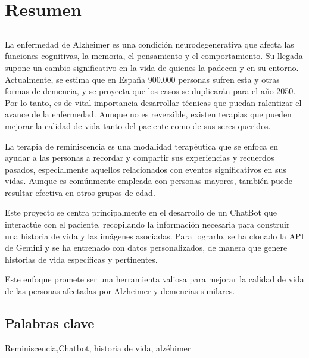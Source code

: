 \chapter*{Resumen}
\section*{\tituloPortadaVal}
La enfermedad de Alzheimer es una condición neurodegenerativa que afecta las funciones cognitivas, la memoria, el pensamiento y el comportamiento. Su llegada supone un cambio significativo en la vida de quienes la padecen y en su entorno. Actualmente, se estima que en España 900.000 personas sufren esta y otras formas de demencia, y se proyecta que los casos se duplicarán para el año 2050. Por lo tanto, es de vital importancia desarrollar técnicas que puedan ralentizar el avance de la enfermedad. Aunque no es reversible, existen terapias que pueden mejorar la calidad de vida tanto del paciente como de sus seres queridos.

La terapia de reminiscencia es una modalidad terapéutica que se enfoca en ayudar a las personas a recordar y compartir sus experiencias y recuerdos pasados, especialmente aquellos relacionados con eventos significativos en sus vidas. Aunque es comúnmente empleada con personas mayores, también puede resultar efectiva en otros grupos de edad.

Este proyecto se centra principalmente en el desarrollo de un ChatBot que interactúe con el paciente, recopilando la información necesaria para construir una historia de vida y las imágenes asociadas. Para lograrlo, se ha clonado la API de Gemini y se ha entrenado con datos personalizados, de manera que genere historias de vida específicas y pertinentes.

Este enfoque promete ser una herramienta valiosa para mejorar la calidad de vida de las personas afectadas por Alzheimer y demencias similares. 

\section*{Palabras clave}
   
\noindent Reminiscencia,Chatbot, historia de vida, alzéhimer

   


